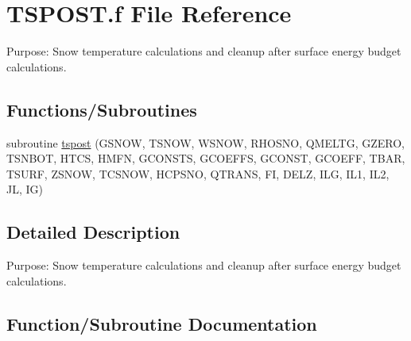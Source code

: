 \hypertarget{TSPOST_8f}{}\section{T\+S\+P\+O\+S\+T.\+f File Reference}
\label{TSPOST_8f}


Purpose\+: Snow temperature calculations and cleanup after surface energy budget calculations.  


\subsection*{Functions/\+Subroutines}
\begin{DoxyCompactItemize}
\item 
subroutine \hyperlink{TSPOST_8f_aea20a5bd0b4d139bb0537c5e0a79788f}{tspost} (G\+S\+N\+O\+W, T\+S\+N\+O\+W, W\+S\+N\+O\+W, R\+H\+O\+S\+N\+O, Q\+M\+E\+L\+T\+G, G\+Z\+E\+R\+O, T\+S\+N\+B\+O\+T, H\+T\+C\+S, H\+M\+F\+N, G\+C\+O\+N\+S\+T\+S, G\+C\+O\+E\+F\+F\+S, G\+C\+O\+N\+S\+T, G\+C\+O\+E\+F\+F, T\+B\+A\+R, T\+S\+U\+R\+F, Z\+S\+N\+O\+W, T\+C\+S\+N\+O\+W, H\+C\+P\+S\+N\+O, Q\+T\+R\+A\+N\+S, F\+I, D\+E\+L\+Z, I\+L\+G, I\+L1, I\+L2, J\+L, I\+G)
\end{DoxyCompactItemize}


\subsection{Detailed Description}
Purpose\+: Snow temperature calculations and cleanup after surface energy budget calculations. 



\subsection{Function/\+Subroutine Documentation}
\hypertarget{TSPOST_8f_aea20a5bd0b4d139bb0537c5e0a79788f}{}
